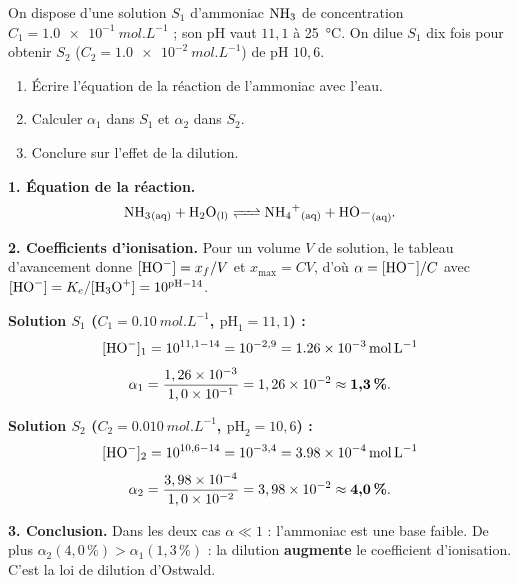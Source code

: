 \documentclass[11pt]{article}
\newcommand{\cle}[1]{{\popxbold\color{popdark}#1}}
\begin{document}
\begin{exoresolu}
On dispose d'une solution $S_1$ d'ammoniac $\ce{NH3}$ de concentration $C_1 = \SI{1,0e-1}{mol.L^{-1}}$ ; son pH vaut $11,1$ à \SI{25}{\celsius}. On dilue $S_1$ dix fois pour obtenir $S_2$ ($C_2 = \SI{1,0e-2}{mol.L^{-1}}$) de pH $10,6$.
\begin{enumerate}
\item Écrire l'équation de la réaction de l'ammoniac avec l'eau.
\item Calculer $\alpha_1$ dans $S_1$ et $\alpha_2$ dans $S_2$.
\item Conclure sur l'effet de la dilution.
\end{enumerate}
\tcblower
\textbf{1. Équation de la réaction.}
\[ \ce{NH3_{(aq)} + H2O_{(l)} <=> NH4+_{(aq)} + HO-_{(aq)}}. \]

\textbf{2. Coefficients d'ionisation.}
Pour un volume $V$ de solution, le tableau d'avancement donne $[\ce{HO-}] = x_f/V$ et $x_{\text{max}} = CV$, d'où $\alpha = [\ce{HO-}]/C$ avec $[\ce{HO-}] = K_e/[\ce{H3O+}] = 10^{\mathrm{pH}-14}$.

\textbf{Solution $S_1$ ($C_1 = \SI{0,10}{mol.L^{-1}}$, $\mathrm{pH}_1 = 11,1$) :}
\[ [\ce{HO-}]_1 = 10^{11,1-14} = 10^{-2,9} = \SI{1,26e-3}{mol.L^{-1}} \]
\[ \alpha_1 = \frac{1,26\times10^{-3}}{1,0\times10^{-1}} = 1,26\times10^{-2} \approx \textbf{1,3\,\%}. \]

\textbf{Solution $S_2$ ($C_2 = \SI{0,010}{mol.L^{-1}}$, $\mathrm{pH}_2 = 10,6$) :}
\[ [\ce{HO-}]_2 = 10^{10,6-14} = 10^{-3,4} = \SI{3,98e-4}{mol.L^{-1}} \]
\[ \alpha_2 = \frac{3,98\times10^{-4}}{1,0\times10^{-2}} = 3,98\times10^{-2} \approx \textbf{4,0\,\%}. \]

\textbf{3. Conclusion.}
Dans les deux cas $\alpha \ll 1$ : l'ammoniac est une \cle{base faible}. De plus $\alpha_2 (4,0\,\%) > \alpha_1 (1,3\,\%)$ : la dilution \textbf{augmente} le coefficient d'ionisation. C'est la \cle{loi de dilution d'Ostwald}.
\end{exoresolu}
\end{document}
